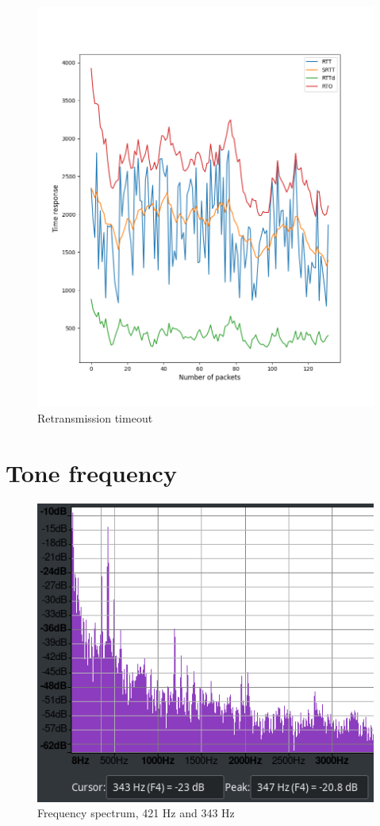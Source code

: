 \documentclass[hidelinks, 12pt, a4paper]{article}
\begin{document}
\begin{figure}[h!]
\centering
	\includegraphics[height=.38\textheight, width=\textwidth]{assets/session1/r1.png}
	\caption{Retransmission timeout} 
\end{figure}

\section{Tone frequency}

\begin{figure}[h!]
\centering
	\includegraphics[height=.37\textheight, width=\textwidth]{assets/session1/spectrum.png}
    \caption{Frequency spectrum, 421 Hz and 343 Hz}
\end{figure}
\end{document}
